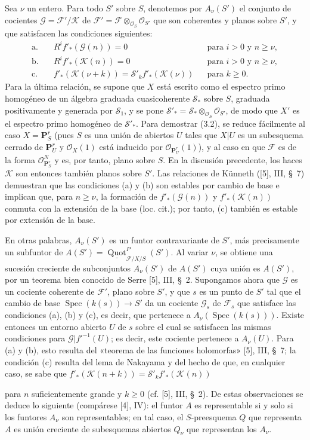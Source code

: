 \documentclass[11pt,twoside,openany]{book}
\numberwithin{equation}{section}
\newcommand{\src}[1]{%
  \phantomsection\hypertarget{src:#1}{}%
  \marginpar{\raggedleft\footnotesize\sffamily #1}%
}
\theoremstyle{plain}
\theoremstyle{definition}
\theoremstyle{remark}
\newcommand{\FgaUnitKey}{frontmatter}
\renewcommand{\src}[1]{%
  \phantomsection\hypertarget{src:\FgaUnitKey:#1}{}%
  \marginpar{\raggedleft\footnotesize\sffamily #1}%
}
\theoremstyle{plain}
\theoremstyle{definition}
\theoremstyle{remark}
\begin{document}
Sea $\nu$ un entero. Para todo $S'$ sobre $S$, denotemos por $A_\nu(S')$ el
conjunto de cocientes $\mathcal G=\mathcal F'/\mathcal K$ de
$\mathcal F'=\mathcal F\otimes_{\mathcal O_S}\mathcal O_{S'}$ que son
coherentes y planos sobre $S'$, y que satisfacen las condiciones siguientes:
\begin{align*}
\text{a.}\quad &R^if'_*(\mathcal G(n))=0 &&\text{para $i>0$ y $n\geq\nu$},\\
\text{b.}\quad &R^if'_*(\mathcal K(n))=0 &&\text{para $i>0$ y $n\geq\nu$},\\
\text{c.}\quad &f'_*(\mathcal K(\nu+k))
=\mathcal S'_k f'_*(\mathcal K(\nu)) &&\text{para $k\geq0$}.
\end{align*}
Para la última relación, se supone que $X$ está escrito como el espectro primo
homogéneo de un álgebra graduada cuasicoherente $\mathcal S_*$ sobre $S$,
graduada positivamente y generada por $\mathcal S_1$, y se pone
$\mathcal S'_* =\mathcal S_*\otimes_{\mathcal O_S}\mathcal O_{S'}$, de modo
que $X'$ es el espectro primo homogéneo de $\mathcal S'_*$. Para demostrar
(3.2), se reduce fácilmente al caso $X=\mathbf P^r_S$ (pues $S$ es una unión
de abiertos $U$ tales que $X|U$ es un subesquema cerrado de $\mathbf P^r_U$ y
$\mathcal O_X(1)$ está inducido por $\mathcal O_{\mathbf P^r_U}(1)$), y al
caso en que $\mathcal F$ es de la forma
$\mathcal O_{\mathbf P^r_S}^{N}$ y es, por tanto, plano sobre $S$. En la
discusión precedente, los haces $\mathcal K$ son entonces también planos sobre
$S'$. Las relaciones de Künneth ([5], III, \S~7) demuestran que las condiciones
(a) y (b) son estables por cambio de base e implican que, para $n\geq\nu$, la
formación de $f'_*(\mathcal G(n))$ y $f'_*(\mathcal K(n))$ conmuta con la
extensión de la base (loc. cit.); por tanto, (c) también es estable por
extensión de la base.

En otras palabras, $A_\nu(S')$ es un funtor contravariante de $S'$, más
precisamente un subfuntor de
$A(S')=\underline{\operatorname{Quot}}^P_{\mathcal F/X/S}(S')$. Al variar
$\nu$, se obtiene una sucesión creciente de subconjuntos $A_\nu(S')$ de
$A(S')$ cuya unión es $A(S')$, por un teorema bien conocido de Serre [5], III,
\S~2. Supongamos ahora que $\mathcal G$ es un cociente coherente de
$\mathcal F'$, plano sobre $S'$, y que $s$ es un punto de $S'$ tal que el
cambio de base $\operatorname{Spec}(k(s))\longrightarrow S'$ da un cociente
$\mathcal G_s$ de $\mathcal F_s$ que satisface las condiciones (a), (b) y (c),
es decir, que pertenece a $A_\nu(\operatorname{Spec}(k(s)))$. Existe entonces
un entorno abierto $U$ de $s$ sobre el cual se satisfacen las mismas
condiciones para $\mathcal G|f'^{-1}(U)$; es decir, este cociente pertenece a
$A_\nu(U)$. Para (a) y (b), esto resulta del «teorema de las funciones
holomorfas» [5], III, \S~7; la condición (c) resulta del lema de Nakayama y del
hecho de que, en cualquier caso, se sabe que
$f'_*(\mathcal K(n+k))=\mathcal S'_k f'_*(\mathcal K(n))$
\src{261}
para $n$ suficientemente grande y $k\geq0$ (cf. [5], III, \S~2). De estas
observaciones se deduce lo siguiente (compárese [4], IV): el funtor $A$ es
representable si y solo si los funtores $A_\nu$ son representables; en tal
caso, el $S$-preesquema $Q$ que representa $A$ es unión creciente de
subesquemas abiertos $Q_\nu$ que representan los $A_\nu$.
\end{document}
